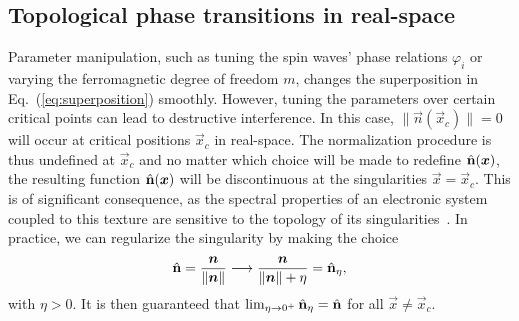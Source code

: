 \documentclass[submission, Phys]{SciPost}
\begin{document}
\subsection{Topological phase transitions in real-space}
\label{subsec:real_space_phase_transitions}

Parameter manipulation, such as tuning the spin waves' phase relations $\varphi_i$ or varying the ferromagnetic degree of freedom $m$, changes the superposition in Eq.~(\ref{eq:superposition}) smoothly. 
However, tuning the parameters over certain critical points can lead to destructive interference.
In this case, $\| \vec{n}(\vec{x}_c) \| = 0$ will occur at critical positions $\vec{x}_c$ in real-space.
The normalization procedure is thus undefined at $\vec{x}_c$ and no matter which choice will be made to redefine $\hat{\mathbf{n}}(\boldsymbol{x})$, the resulting function $\hat{\mathbf{n}}(\boldsymbol{x})$ will be discontinuous at the singularities $\vec{x}=\vec{x}_c$.
This is of significant consequence, as the spectral properties of an electronic system coupled to this texture are sensitive to the topology of its singularities~\cite{Teo2010}.
In practice, we can regularize the singularity by making the choice
\begin{align}
    \hat{\mathbf{n}} = \frac{\boldsymbol{n}}{ \| \boldsymbol{n} \| } \longrightarrow   \frac{\boldsymbol{n}}{ \| \boldsymbol{n} \| +  \eta }  =   \hat{\mathbf{n}}_\eta ,
    \label{eq:regularize}
\end{align}
with $\eta >0 $. It is then guaranteed that $\lim_{\eta \to 0^+}\hat{\mathbf{n}}_\eta = \hat{\mathbf{n}}$ for all $\vec{x} \neq \vec{x}_c$. 
\end{document}
